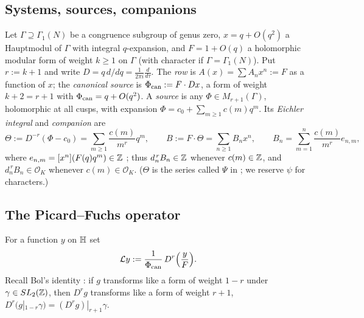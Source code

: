 \documentclass[11pt]{amsart}
\theoremstyle{definition}
\theoremstyle{remark}
\begin{document}
\subsection{Systems, sources, companions}
Let $\Gamma\supseteq\Gamma_1(N)$ be a congruence subgroup of genus zero, $x=q+O(q^2)$ a Hauptmodul of $\Gamma$ with integral $q$-expansion, and $F=1+O(q)$ a holomorphic modular form of weight $k\ge1$ on $\Gamma$ (with character if $\Gamma=\Gamma_1(N)$). Put $r:=k+1$ and write $D=q\,d/dq=\frac1{2\pi i}\frac d{d\tau}$. The \emph{row} is $A(x)=\sum A_nx^n:=F$ as a function of $x$; the \emph{canonical source} is $\Phi_{\rm can}:=F\cdot Dx$, a form of weight $k+2=r+1$ with $\Phi_{\rm can}=q+O(q^2)$. A \emph{source} is any $\Phi\in M_{r+1}(\Gamma)$, holomorphic at all cusps, with expansion $\Phi=c_0+\sum_{m\ge1}c(m)q^m$. Its \emph{Eichler integral} and \emph{companion} are
\begin{equation}\label{eq:companion}
\Theta:=D^{-r}(\Phi-c_0)=\sum_{m\ge1}\frac{c(m)}{m^r}q^m,\qquad B:=F\cdot\Theta=\sum_{n\ge1}B_nx^n,\qquad B_n=\sum_{m=1}^n\frac{c(m)}{m^r}e_{n,m},
\end{equation}
where $e_{n,m}=[x^n](F(q)q^m)\in\mathbb Z$ \cite[\S2]{Companions}; thus $d_n^{\,r}B_n\in\mathbb Z$ whenever $c(m)\in\mathbb Z$, and $d_n^{\,r}B_n\in\mathcal O_K$ whenever $c(m)\in\mathcal O_K$. ($\Theta$ is the series called $\Psi$ in \cite{Companions}; we reserve $\psi$ for characters.)

\subsection{The Picard--Fuchs operator}
For a function $y$ on $\mathbb H$ set
\begin{equation}\label{eq:L}
\mathcal Ly:=\frac{1}{\Phi_{\rm can}}\,D^{r}\Bigl(\frac yF\Bigr).
\end{equation}
Recall Bol's identity \cite{Bol}: if $g$ transforms like a form of weight $1-r$ under $\gamma\in SL_2(\mathbb Z)$, then $D^rg$ transforms like a form of weight $r+1$, $D^r(g|_{1-r}\gamma)=(D^rg)|_{r+1}\gamma$.
\end{document}
